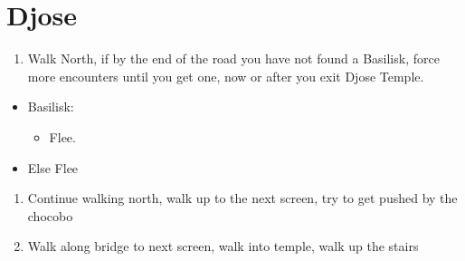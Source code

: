 \chapter{Djose}
\begin{enumerate}
    \item Walk North, if by the end of the road you have not found a Basilisk, force more encounters until you get one, now or after you exit Djose Temple.
\end{enumerate}
\begin{encounters}
    \begin{itemize}
        \item Basilisk:
        \begin{itemize}
            \kimahrif Lancet Basilisk, learn \textbf{Stone Breath}
            \item Flee.
        \end{itemize}
        \item Else Flee
    \end{itemize}
\end{encounters}
\begin{enumerate}[resume]
    \item Continue walking north, walk up to the next screen, try to get pushed by the chocobo
    \item Walk along bridge to next screen, walk into temple, walk up the stairs
\end{enumerate}
